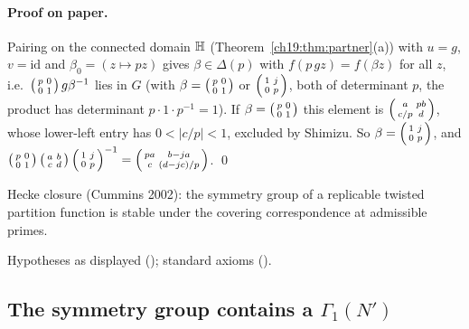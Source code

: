 \paragraph{Proof on paper.}  Pairing on the connected domain $\mathbb{H}$ (Theorem~\ref{ch19:thm:partner}(a)) with $u=g$, $v=\mathrm{id}$ and
$\beta_0=(z\mapsto pz)$ gives $\beta\in\Delta(p)$ with $f(p\,gz)=f(\beta z)$ for all $z$, i.e.\ $\left(\begin{smallmatrix}p&0\\0&1\end{smallmatrix}\right)g\beta^{-1}$ lies in $G$
(with $\beta=\left(\begin{smallmatrix}p&0\\0&1\end{smallmatrix}\right)$ or $\left(\begin{smallmatrix}1&j\\0&p\end{smallmatrix}\right)$, both of determinant $p$, the product has determinant $p\cdot1\cdot p^{-1}=1$).  If $\beta=\left(\begin{smallmatrix}p&0\\0&1\end{smallmatrix}\right)$ this element is $\left(\begin{smallmatrix}a&pb\\c/p&d\end{smallmatrix}\right)$, whose lower-left entry has $0<|c/p|<1$, excluded by
Shimizu.  So $\beta=\left(\begin{smallmatrix}1&j\\0&p\end{smallmatrix}\right)$, and $\left(\begin{smallmatrix}p&0\\0&1\end{smallmatrix}\right)\left(\begin{smallmatrix}a&b\\c&d\end{smallmatrix}\right)\left(\begin{smallmatrix}1&j\\0&p\end{smallmatrix}\right)^{-1}=\left(\begin{smallmatrix}pa&b-ja\\c&(d-jc)/p\end{smallmatrix}\right)$. \qed
\begin{physics}Hecke closure (Cummins 2002): the symmetry group of a replicable twisted partition function is stable under the
covering correspondence at admissible primes.\end{physics}
\begin{status}Hypotheses as displayed (); standard axioms
().\end{status}

\subsection{The symmetry group contains a \texorpdfstring{$\Gamma_1(N')$}{Gamma1(N')}}


